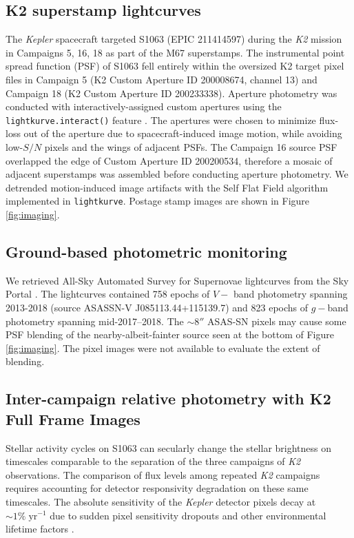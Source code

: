 \documentclass[modern,trackchanges]{aastex631}
\begin{document}
\subsection{K2 superstamp lightcurves}
The \emph{Kepler} spacecraft targeted S1063 (EPIC 211414597) during the \emph{K2} mission \citep{howell14} in Campaigns 5, 16, 18 as part of the M67 superstamps.  The instrumental point spread function (PSF) of S1063 fell entirely within the oversized K2 target pixel files in Campaign 5 (K2 Custom Aperture ID 200008674, channel 13) and Campaign 18 (K2 Custom Aperture ID 200233338).  Aperture photometry was conducted with interactively-assigned custom apertures using the \texttt{lightkurve.interact()} feature \citep{geert_barentsen_2019_2565212}. The apertures were chosen to minimize flux-loss out of the aperture due to spacecraft-induced image motion, while avoiding low-$S/N$ pixels and the wings of adjacent PSFs.  The Campaign 16 source PSF overlapped the edge of Custom Aperture ID 200200534, therefore a mosaic of adjacent superstamps was assembled before conducting aperture photometry.
We detrended motion-induced image artifacts with the Self Flat Field algorithm \citep{vanderburg14} implemented in \texttt{lightkurve}.  Postage stamp images are shown in Figure \ref{fig:imaging}.


\subsection{Ground-based photometric monitoring}
We retrieved All-Sky Automated Survey for Supernovae \citep[ASAS-SN;][]{shappee14} lightcurves from the Sky Portal \citep{2017PASP..129j4502K}.  The lightcurves contained 758 epochs of $V-$ band photometry spanning 2013-2018 (source ASASSN-V J085113.44+115139.7) and 823 epochs of $g-$band photometry spanning mid-2017--2018.  The $\sim8''$ ASAS-SN pixels may cause some PSF blending of the nearby-albeit-fainter source seen at the bottom of Figure \ref{fig:imaging}.  The pixel images were not available to evaluate the extent of blending.

\subsection{Inter-campaign relative photometry with K2 Full Frame Images}\label{sec:K2lightcurve}

Stellar activity cycles on S1063 can secularly change the stellar brightness on timescales comparable to the separation of the three campaigns of \emph{K2} observations.  The comparison of flux levels among repeated \emph{K2} campaigns requires accounting for detector responsivity degradation on these same timescales.  The absolute sensitivity of the \emph{Kepler} detector pixels decay at $\sim1 \%\;\textrm{yr}^{-1}$ due to sudden pixel sensitivity dropouts and other environmental lifetime factors \citep{montet17}. 
\end{document}
